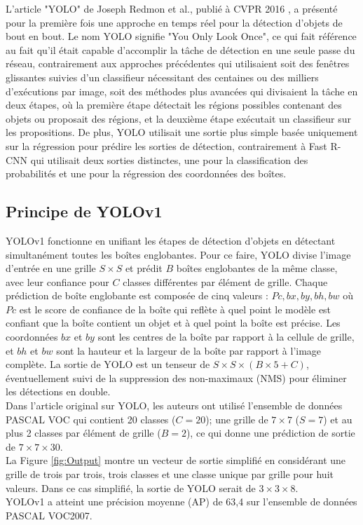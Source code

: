 \documentclass{article}
\begin{document}
L'article "YOLO" de Joseph Redmon et al., publié à CVPR 2016 \cite{38}, a présenté pour la première fois une approche en temps réel pour la détection d'objets de bout en bout. Le nom YOLO signifie "You Only Look Once", ce qui fait référence au fait qu'il était capable d'accomplir la tâche de détection en une seule passe du réseau, contrairement aux approches précédentes qui utilisaient soit des fenêtres glissantes suivies d'un classifieur nécessitant des centaines ou des milliers d'exécutions par image, soit des méthodes plus avancées qui divisaient la tâche en deux étapes, où la première étape détectait les régions possibles contenant des objets ou proposait des régions, et la deuxième étape exécutait un classifieur sur les propositions. De plus, YOLO utilisait une sortie plus simple basée uniquement sur la régression pour prédire les sorties de détection, contrairement à Fast R-CNN \cite{39} qui utilisait deux sorties distinctes, une pour la classification des probabilités et une pour la régression des coordonnées des boîtes.

\subsection{Principe de YOLOv1}

YOLOv1 fonctionne en unifiant les étapes de détection d'objets en détectant simultanément toutes les boîtes englobantes. Pour ce faire, YOLO divise l'image d'entrée en une grille $S\times S$ et prédit $B$ boîtes englobantes de la même classe, avec leur confiance pour $C$ classes différentes par élément de grille. Chaque prédiction de boîte englobante est composée de cinq valeurs : $Pc, bx, by, bh, bw$ où $Pc$ est le score de confiance de la boîte qui reflète à quel point le modèle est confiant que la boîte contient un objet et à quel point la boîte est précise. Les coordonnées $bx$ et $by$ sont les centres de la boîte par rapport à la cellule de grille, et $bh$ et $bw$ sont la hauteur et la largeur de la boîte par rapport à l'image complète. La sortie de YOLO est un tenseur de $S \times S \times (B\times 5 + C)$, éventuellement suivi de la suppression des non-maximaux (NMS) pour éliminer les détections en double.
\vspace{0.2cm}\\
Dans l'article original sur YOLO, les auteurs ont utilisé l'ensemble de données PASCAL VOC \cite{36} qui contient 20 classes ($C = 20$); une grille de $7\times 7$ ($S = 7$) et au plus 2 classes par élément de grille ($B = 2$), ce qui donne une prédiction de sortie de $7\times 7\times 30$.
\vspace{0.2cm}\\
La Figure \ref{fig:Output} montre un vecteur de sortie simplifié en considérant une grille de trois par trois, trois classes et une classe unique par grille pour huit valeurs. Dans ce cas simplifié, la sortie de YOLO serait de $3 \times 3 \times 8$.
\vspace{0.2cm}\\
YOLOv1 a atteint une précision moyenne (AP) de 63,4 sur l'ensemble de données PASCAL VOC2007.
\end{document}
